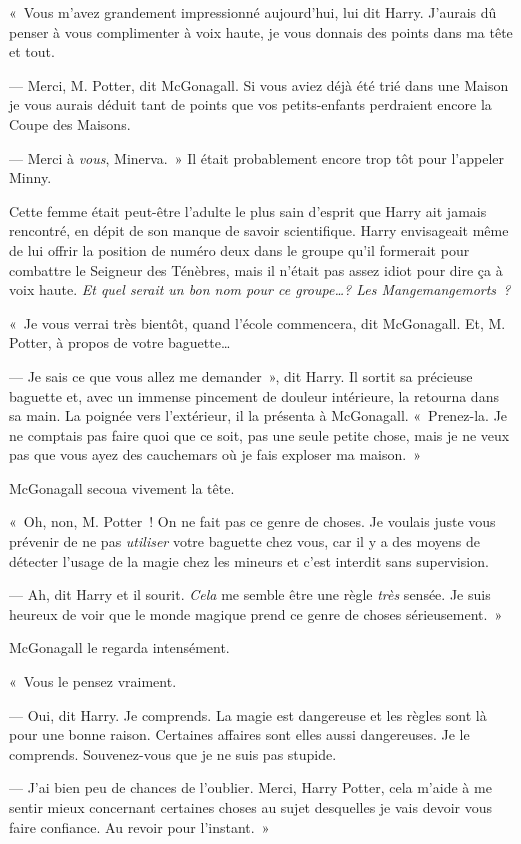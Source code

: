 «~Vous m'avez grandement impressionné aujourd'hui, lui dit Harry. J'aurais dû penser à vous complimenter à voix haute, je vous donnais des points dans ma tête et tout.

--- Merci, M. Potter, dit McGonagall. Si vous aviez déjà été trié dans une Maison je vous aurais déduit tant de points que vos petits-enfants perdraient encore la Coupe des Maisons.

--- Merci à \emph{vous}, Minerva.~» Il était probablement encore trop tôt pour l'appeler Minny.

Cette femme était peut-être l'adulte le plus sain d'esprit que Harry ait jamais rencontré, en dépit de son manque de savoir scientifique. Harry envisageait même de lui offrir la position de numéro deux dans le groupe qu'il formerait pour combattre le Seigneur des Ténèbres, mais il n'était pas assez idiot pour dire ça à voix haute. \emph{Et quel serait un bon nom pour ce groupe…? Les Mangemangemorts~?}

«~Je vous verrai très bientôt, quand l'école commencera, dit McGonagall. Et, M. Potter, à propos de votre baguette…

--- Je sais ce que vous allez me demander~», dit Harry. Il sortit sa précieuse baguette et, avec un immense pincement de douleur intérieure, la retourna dans sa main. La poignée vers l'extérieur, il la présenta à McGonagall. «~Prenez-la. Je ne comptais pas faire quoi que ce soit, pas une seule petite chose, mais je ne veux pas que vous ayez des cauchemars où je fais exploser ma maison.~»

McGonagall secoua vivement la tête.

«~Oh, non, M. Potter~! On ne fait pas ce genre de choses. Je voulais juste vous prévenir de ne pas \emph{utiliser} votre baguette chez vous, car il y a des moyens de détecter l'usage de la magie chez les mineurs et c'est interdit sans supervision.

--- Ah, dit Harry et il sourit. \emph{Cela} me semble être une règle \emph{très} sensée. Je suis heureux de voir que le monde magique prend ce genre de choses sérieusement.~»

McGonagall le regarda intensément.

«~Vous le pensez vraiment.

--- Oui, dit Harry. Je comprends. La magie est dangereuse et les règles sont là pour une bonne raison. Certaines affaires sont elles aussi dangereuses. Je le comprends. Souvenez-vous que je ne suis pas stupide.

--- J'ai bien peu de chances de l'oublier. Merci, Harry Potter, cela m'aide à me sentir mieux concernant certaines choses au sujet desquelles je vais devoir vous faire confiance. Au revoir pour l'instant.~»

